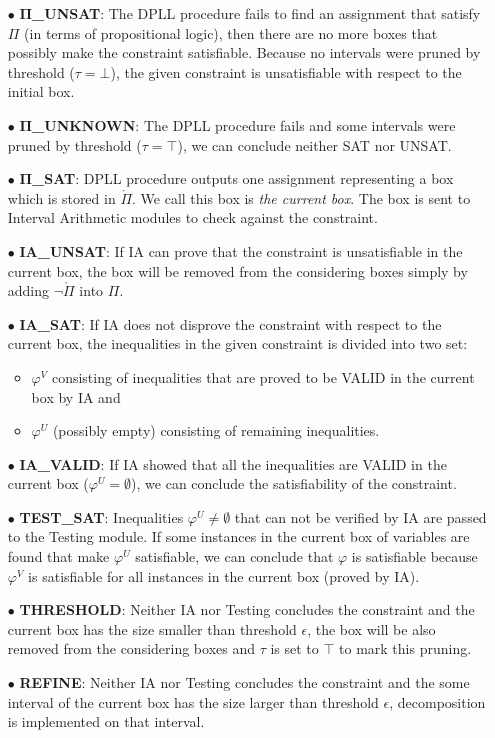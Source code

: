 \begin{itemize}
\item[$\bullet$]\textbf{$\pmb\Pi$\_UNSAT}: The DPLL procedure fails to find an assignment that satisfy $\Pi$ (in terms of propositional logic), then there are no more boxes that possibly make the constraint satisfiable. Because no intervals were pruned by threshold ($\tau = \bot$), the given constraint is unsatisfiable with respect to the initial box.
\item[$\bullet$]\textbf{$\pmb\Pi$\_UNKNOWN}: The DPLL procedure fails and some intervals were pruned by threshold ($\tau = \top$), we can conclude neither SAT nor UNSAT.
\item[$\bullet$]\textbf{$\pmb\Pi$\_SAT}: DPLL procedure outputs one assignment representing a box which is stored in $\mathring{\Pi}$. We call this box is \emph{the current box}. The box is sent to Interval Arithmetic modules to check against the constraint.
\item[$\bullet$]\textbf{IA\_UNSAT}: If IA can prove that the constraint is unsatisfiable in the current box, the box will be removed from the considering boxes simply by adding $\neg\mathring{\Pi}$ into $\Pi$.
\item[$\bullet$]\textbf{IA\_SAT}: If IA does not disprove the constraint with respect to the current box, the inequalities in the given constraint is divided into two set: 
\begin{itemize}
\item $\varphi^V$ consisting of inequalities that are proved to be VALID in the current box by IA and
\item $\varphi^U$ (possibly empty) consisting of remaining inequalities. 
\end{itemize}
\item[$\bullet$]\textbf{IA\_VALID}: If IA showed that all the inequalities are VALID in the current box ($\varphi^U = \emptyset$), we can conclude the satisfiability of the constraint. 
\item[$\bullet$]\textbf{TEST\_SAT}: Inequalities $\varphi^U \not= \emptyset$ that can not be verified by IA are passed to the Testing module. If some instances in the current box of variables are found that make $\varphi^U$ satisfiable, we can conclude that $\varphi$ is satisfiable because $\varphi^V$ is satisfiable for all instances in the current box (proved by IA).
\item[$\bullet$]\textbf{THRESHOLD}: Neither IA nor Testing concludes the constraint and the current box has the size smaller than threshold $\epsilon$, the box will be also removed from the considering boxes and $\tau$ is set to $\top$ to mark this pruning.
\item[$\bullet$]\textbf{REFINE}: Neither IA nor Testing concludes the constraint and the some interval of the current box has the size larger than threshold $\epsilon$, decomposition is implemented on that interval.
\end{itemize}
